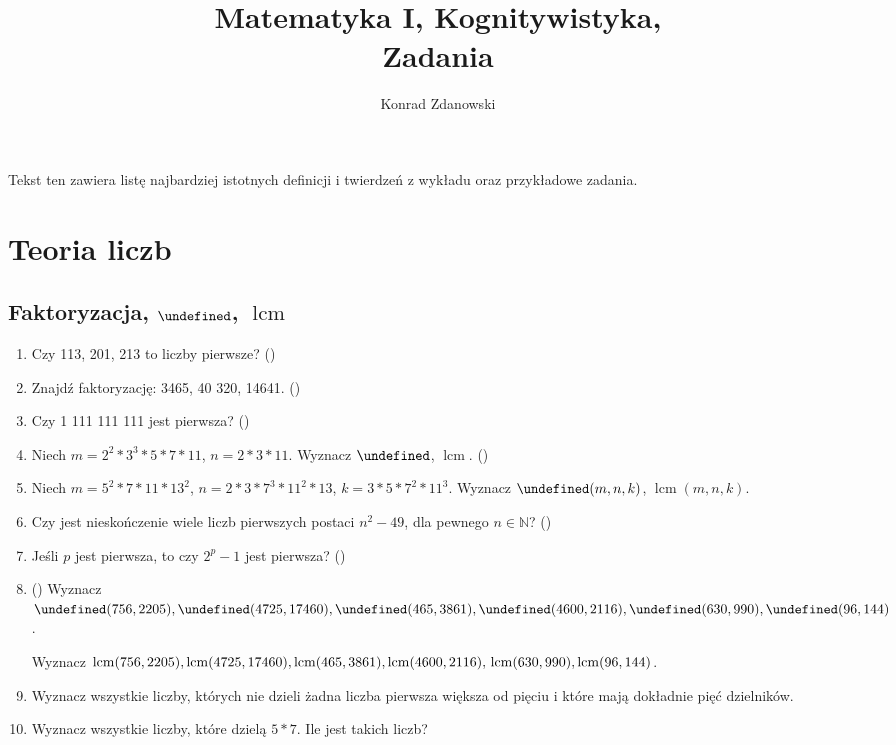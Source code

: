 \documentclass[12pt]{article}
\title{Matematyka I, Kognitywistyka,\\
        Zadania}
\author{Konrad Zdanowski}
\let\gcd\undefined
\DeclareMathOperator{\gcd}{gcd}
\DeclareMathOperator{\lcm}{lcm}
\newcommand{\NN}{\mathbb{N}}
\begin{document}
\maketitle
\thispagestyle{empty}

Tekst ten zawiera listę najbardziej istotnych definicji
i twierdzeń z wykładu oraz przykładowe zadania.

\section{Teoria liczb}
\subsection{Faktoryzacja, $\gcd$, $\lcm$}
\begin{enumerate}
    \item Czy 113, 201, 213 to liczby pierwsze? 
        (\cite[4.6.3, zad. 2]{Forman.2015})
     \item Znajdź faktoryzację: 3465, 40 320, 14641.  (\cite{Forman.2015})	
\item  Czy 1 111 111 111 jest pierwsza? (\cite{Forman.2015})
\item Niech $m = 2^2*3^3 * 5 * 7* 11$,  $n = 2*3*11$.
   Wyznacz $\gcd$, $\lcm$. (\cite{Forman.2015})
\item Niech $m = 5^2*7*11*13^2$, $n = 2*3*7^3*11^2*13$,
            $k=3*5*7^2*11^3$.
   Wyznacz $\gcd(m,n,k)$, $\lcm(m,n,k)$. 
\item 
 Czy jest nieskończenie wiele liczb pierwszych postaci $n^2 - 49$,
 dla pewnego $n\in\NN$? (\cite{Forman.2015})
\item 
Jeśli $p$ jest pierwsza, to czy $2^p - 1$ jest pierwsza? (\cite{Forman.2015})
\item  (\cite{Forman.2015})
 Wyznacz
    $\gcd(756, 2205),
    \gcd(4725, 17460), 
    \gcd(465, 3861),
    \gcd(4600, 2116), \\
    \gcd(630, 990), 
    \gcd(96, 144)$.

Wyznacz
$\lcm(756, 2205),
\lcm(4725, 17460),
\lcm(465, 3861),
\lcm(4600, 2116),\\
\lcm(630, 990),
\lcm(96, 144)$.


\item Wyznacz wszystkie liczby, których nie dzieli
żadna liczba pierwsza większa od pięciu i które mają 
dokładnie pięć dzielników.

\item Wyznacz wszystkie liczby, które dzielą $5*7$. 
      Ile jest takich liczb?


\end{enumerate}
\end{document}
